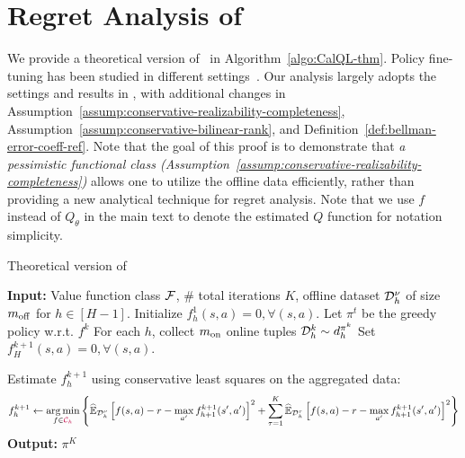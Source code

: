 \vspace{-0.2cm}
\section{Regret Analysis of \methodname}
\vspace{-0.2cm}
We provide a theoretical version of \methodname\ in Algorithm~\ref{algo:CalQL-thm}. Policy fine-tuning has been studied in different settings~\citep{xie2021policy,song2023hybrid,wagenmaker2022leveraging}. Our analysis largely adopts the settings and results in \citet{song2023hybrid}, with additional changes in Assumption~\ref{assump:conservative-realizability-completeness}, Assumption~\ref{assump:conservative-bilinear-rank}, and Definition~\ref{def:bellman-error-coeff-ref}. Note that the goal of this proof is to demonstrate that
{\em a pessimistic functional class (Assumption~\ref{assump:conservative-realizability-completeness})} allows one to utilize the offline data efficiently, rather than providing a new analytical technique for regret analysis. Note that we use $f$ instead of $Q_\theta$ in the main text to denote the estimated $Q$ function for notation simplicity.

\begin{algorithm}[H]

\caption{Theoretical version of \methodname}\label{algo:CalQL-thm}
  \begin{algorithmic}[1]
    \State \textbf{Input:} Value function class $\mathcal F$, \# total iterations $K$, offline dataset $\mathcal D_h^\nu$ of size $m_\mathrm{off}$ for $h\in[H-1]$.
    \State Initialize $f_h^1(s,a)=0,\forall (s,a)$.
    \State Let $\pi^t$ be the greedy policy w.r.t. $f^k$ 
    \State For each $h$, collect $m_\mathrm{on}$ online tuples $\mathcal D_h^k\sim d_h^{\pi^k}$ 
    \State Set $f_H^{k+1}(s,a)=0,\forall (s,a)$.

     
        \State Estimate $f_h^{k+1}$ using {\color{purple} conservative} least squares on the aggregated data: {\color{purple} }
        {\scriptsize
        \begin{equation}
            \label{eq:least-square-our-method}f_h^{k+1}\leftarrow\underset{f\in {\color{purple}\mathcal C_h}}{\arg\min}\left\{ \widehat{\mathbb E}_{\mathcal D^\nu_h}\left[ f(s,a)-r-\max_{a^\prime}f_{h+1}^{k+1}(s^\prime,a^\prime) \right]^2 + \sum_{\tau=1}^K\widehat{\mathbb E}_{\mathcal D^\tau_h}\left[ f(s,a)-r-\max_{a^\prime}f_{h+1}^{k+1}(s^\prime,a^\prime) \right]^2 \right\}  
        \end{equation}}
    \EndFor
    \EndFor
    \State \textbf{Output:} $\pi^K$
  \end{algorithmic}
\end{algorithm}



